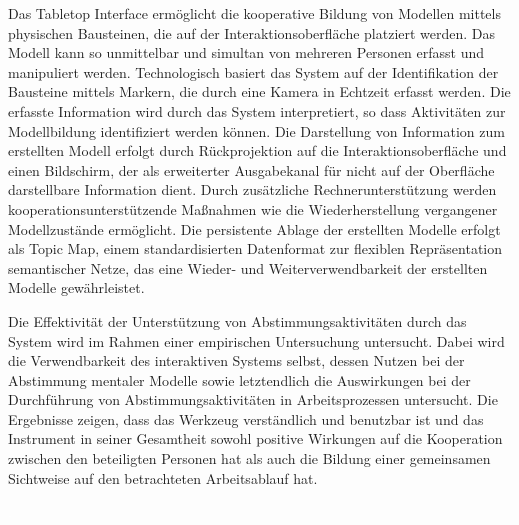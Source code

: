 Das Tabletop Interface ermöglicht die kooperative Bildung von Modellen mittels physischen Bausteinen, die auf der Interaktionsoberfläche platziert werden. Das Modell kann so unmittelbar und simultan von mehreren Personen erfasst und manipuliert werden. Technologisch basiert das System auf der Identifikation der Bausteine mittels Markern, die durch eine Kamera in Echtzeit erfasst werden. Die erfasste Information wird durch das System interpretiert, so dass Aktivitäten zur Modellbildung identifiziert werden können. Die Darstellung von Information zum erstellten Modell erfolgt durch Rückprojektion auf die Interaktionsoberfläche und einen Bildschirm, der als erweiterter Ausgabekanal für nicht auf der Oberfläche darstellbare Information dient. Durch zusätzliche Rechnerunterstützung werden kooperationsunterstützende Maßnahmen wie die Wiederherstellung vergangener Modellzustände ermöglicht. Die persistente Ablage der erstellten Modelle erfolgt als Topic Map, einem standardisierten Datenformat zur flexiblen Repräsentation semantischer Netze, das eine Wieder- und Weiterverwendbarkeit der erstellten Modelle gewährleistet.

Die Effektivität der Unterstützung von Abstimmungsaktivitäten durch das System wird im Rahmen einer empirischen Untersuchung untersucht. Dabei wird die Verwendbarkeit des interaktiven Systems selbst, dessen Nutzen bei der Abstimmung mentaler Modelle sowie letztendlich die Auswirkungen bei der Durchführung von Abstimmungsaktivitäten in Arbeitsprozessen untersucht. Die Ergebnisse zeigen, dass das Werkzeug verständlich und benutzbar ist und das Instrument in seiner Gesamtheit sowohl positive Wirkungen auf die Kooperation zwischen den beteiligten Personen hat als auch die Bildung einer gemeinsamen Sichtweise auf den betrachteten Arbeitsablauf hat.

\newpage
\textcolor{white}
.
\textcolor{black}
\newpage
 
\cleardoublepage

